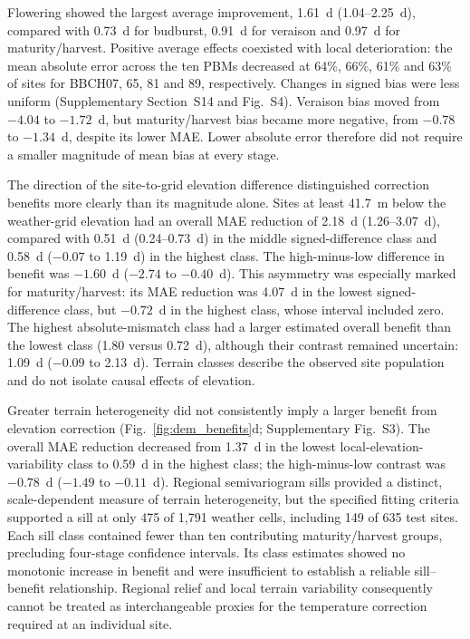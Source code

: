 \documentclass[a4paper,12pt]{article}
\begin{document}
Flowering showed the largest average improvement, 1.61~d (1.04--2.25~d), compared with 0.73~d for budburst, 0.91~d for veraison and 0.97~d for maturity/harvest. Positive average effects coexisted with local deterioration: the mean absolute error across the ten PBMs decreased at 64\%, 66\%, 61\% and 63\% of sites for BBCH07, 65, 81 and 89, respectively. Changes in signed bias were less uniform (Supplementary Section~S14 and Fig.~S4). Veraison bias moved from $-4.04$ to $-1.72$~d, but maturity/harvest bias became more negative, from $-0.78$ to $-1.34$~d, despite its lower MAE. Lower absolute error therefore did not require a smaller magnitude of mean bias at every stage.

The direction of the site-to-grid elevation difference distinguished correction benefits more clearly than its magnitude alone. Sites at least 41.7~m below the weather-grid elevation had an overall MAE reduction of 2.18~d (1.26--3.07~d), compared with 0.51~d (0.24--0.73~d) in the middle signed-difference class and 0.58~d ($-0.07$ to 1.19~d) in the highest class. The high-minus-low difference in benefit was $-1.60$~d ($-2.74$ to $-0.40$~d). This asymmetry was especially marked for maturity/harvest: its MAE reduction was 4.07~d in the lowest signed-difference class, but $-0.72$~d in the highest class, whose interval included zero. The highest absolute-mismatch class had a larger estimated overall benefit than the lowest class (1.80 versus 0.72~d), although their contrast remained uncertain: 1.09~d ($-0.09$ to 2.13~d). Terrain classes describe the observed site population and do not isolate causal effects of elevation.

Greater terrain heterogeneity did not consistently imply a larger benefit from elevation correction (Fig.~\ref{fig:dem_benefits}d; Supplementary Fig.~S3). The overall MAE reduction decreased from 1.37~d in the lowest local-elevation-variability class to 0.59~d in the highest class; the high-minus-low contrast was $-0.78$~d ($-1.49$ to $-0.11$~d). Regional semivariogram sills provided a distinct, scale-dependent measure of terrain heterogeneity, but the specified fitting criteria supported a sill at only 475 of 1,791 weather cells, including 149 of 635 test sites. Each sill class contained fewer than ten contributing maturity/harvest groups, precluding four-stage confidence intervals. Its class estimates showed no monotonic increase in benefit and were insufficient to establish a reliable sill--benefit relationship. Regional relief and local terrain variability consequently cannot be treated as interchangeable proxies for the temperature correction required at an individual site.
\end{document}
